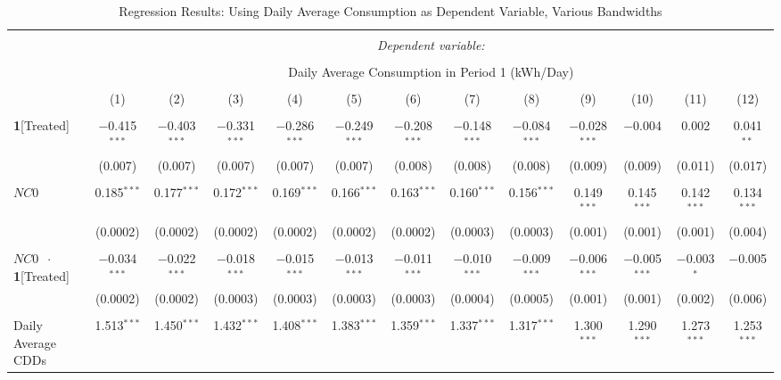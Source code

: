 \begin{table}[!htbp]
\centering 
\caption{Regression Results: Using Daily Average Consumption as Dependent Variable, Various Bandwidths} 
\label{Table:Regression-Results_Daily-Average_BWs} 
\small
\begin{adjustbox}{scale = 0.8}
\begin{tabular}{@{\extracolsep{5pt}}lcccccccccccc} 
\\[-1.8ex]\hline 
\hline \\[-1.8ex] 
 & \multicolumn{12}{c}{\textit{Dependent variable:}} \\ 
\cline{2-13} 
\\[-1.8ex] & \multicolumn{12}{c}{Daily Average Consumption in Period 1 (kWh/Day)} \\ 
\\[-1.8ex] & (1) & (2) & (3) & (4) & (5) & (6) & (7) & (8) & (9) & (10) & (11) & (12)\\ 
\hline \\[-1.8ex] 
 \textbf{1}[Treated] & $-$0.415$^{***}$ & $-$0.403$^{***}$ & $-$0.331$^{***}$ & $-$0.286$^{***}$ & $-$0.249$^{***}$ & $-$0.208$^{***}$ & $-$0.148$^{***}$ & $-$0.084$^{***}$ & $-$0.028$^{***}$ & $-$0.004 & 0.002 & 0.041$^{**}$ \\ 
  & (0.007) & (0.007) & (0.007) & (0.007) & (0.007) & (0.008) & (0.008) & (0.008) & (0.009) & (0.009) & (0.011) & (0.017) \\ 
  & & & & & & & & & & & & \\ 
 $NC0$ & 0.185$^{***}$ & 0.177$^{***}$ & 0.172$^{***}$ & 0.169$^{***}$ & 0.166$^{***}$ & 0.163$^{***}$ & 0.160$^{***}$ & 0.156$^{***}$ & 0.149$^{***}$ & 0.145$^{***}$ & 0.142$^{***}$ & 0.134$^{***}$ \\ 
  & (0.0002) & (0.0002) & (0.0002) & (0.0002) & (0.0002) & (0.0002) & (0.0003) & (0.0003) & (0.001) & (0.001) & (0.001) & (0.004) \\ 
  & & & & & & & & & & & & \\ 
 $NC0$ $\ \cdot \ $ \textbf{1}[Treated] & $-$0.034$^{***}$ & $-$0.022$^{***}$ & $-$0.018$^{***}$ & $-$0.015$^{***}$ & $-$0.013$^{***}$ & $-$0.011$^{***}$ & $-$0.010$^{***}$ & $-$0.009$^{***}$ & $-$0.006$^{***}$ & $-$0.005$^{***}$ & $-$0.003$^{*}$ & $-$0.005 \\ 
  & (0.0002) & (0.0002) & (0.0003) & (0.0003) & (0.0003) & (0.0003) & (0.0004) & (0.0005) & (0.001) & (0.001) & (0.002) & (0.006) \\ 
  & & & & & & & & & & & & \\ 
 Daily Average CDDs & 1.513$^{***}$ & 1.450$^{***}$ & 1.432$^{***}$ & 1.408$^{***}$ & 1.383$^{***}$ & 1.359$^{***}$ & 1.337$^{***}$ & 1.317$^{***}$ & 1.300$^{***}$ & 1.290$^{***}$ & 1.273$^{***}$ & 1.253$^{***}$ \\ 

\end{tabular}
\end{adjustbox}
\end{table}
